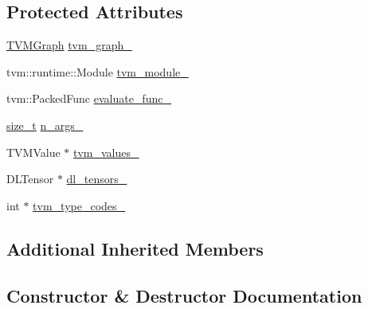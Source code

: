 \subsection*{Protected Attributes}
\begin{DoxyCompactItemize}
\item 
\mbox{\hyperlink{structonnxruntime_1_1TVMGraph}{T\+V\+M\+Graph}} \mbox{\hyperlink{classonnxruntime_1_1TVMKernel_a40d27f1775a22e11a68c1d8f87647f64}{tvm\+\_\+graph\+\_\+}}
\item 
tvm\+::runtime\+::\+Module \mbox{\hyperlink{classonnxruntime_1_1TVMKernel_a5ac8938f6df7ff5b4d2945c531cdfbef}{tvm\+\_\+module\+\_\+}}
\item 
tvm\+::\+Packed\+Func \mbox{\hyperlink{classonnxruntime_1_1TVMKernel_a7d1cf50c7ae704db7e9206e010c866b9}{evaluate\+\_\+func\+\_\+}}
\item 
\mbox{\hyperlink{mlasi_8h_a503efbc1c6e50825320ad909366b78ab}{size\+\_\+t}} \mbox{\hyperlink{classonnxruntime_1_1TVMKernel_aaad762b24a2eac608b2cec83f8acf310}{n\+\_\+args\+\_\+}}
\item 
T\+V\+M\+Value $\ast$ \mbox{\hyperlink{classonnxruntime_1_1TVMKernel_af7810d51459fdd5969b1aaac3237b707}{tvm\+\_\+values\+\_\+}}
\item 
D\+L\+Tensor $\ast$ \mbox{\hyperlink{classonnxruntime_1_1TVMKernel_a095b6b8267de061752bf8407ab7af364}{dl\+\_\+tensors\+\_\+}}
\item 
int $\ast$ \mbox{\hyperlink{classonnxruntime_1_1TVMKernel_a64022db7464ce469edccf37356779a54}{tvm\+\_\+type\+\_\+codes\+\_\+}}
\end{DoxyCompactItemize}
\subsection*{Additional Inherited Members}


\subsection{Constructor \& Destructor Documentation}
\mbox{\label{classonnxruntime_1_1TVMKernel_a9244e055a706bfabafef7bdefa237c24}} 
